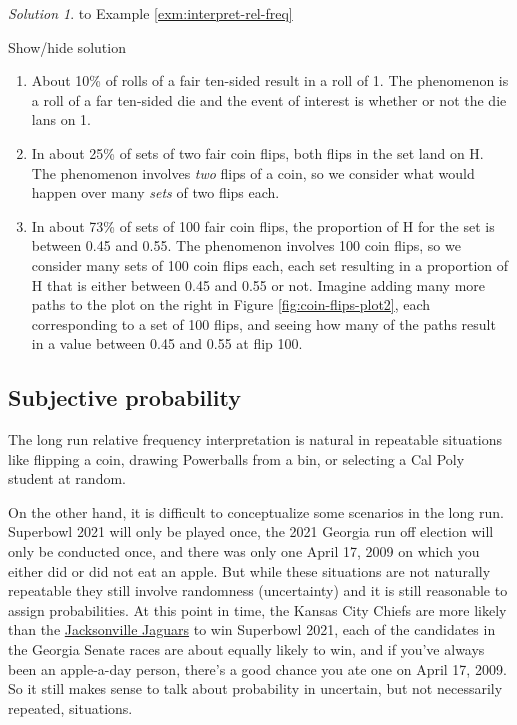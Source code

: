 \documentclass[
]{book}
\providecommand{\tightlist}{%
  \setlength{\itemsep}{0pt}\setlength{\parskip}{0pt}}
\theoremstyle{definition}
\theoremstyle{definition}
\theoremstyle{definition}
\theoremstyle{remark}
\newtheorem*{solution}{Solution}
\begin{document}
\begin{solution}
{}to Example \ref{exm:interpret-rel-freq}
\end{solution}

Show/hide solution

\begin{enumerate}
\def\labelenumi{\arabic{enumi}.}
\tightlist
\item
  About 10\% of rolls of a fair ten-sided result in a roll of 1. The phenomenon is a roll of a far ten-sided die and the event of interest is whether or not the die lans on 1.
\item
  In about 25\% of sets of two fair coin flips, both flips in the set land on H. The phenomenon involves \emph{two} flips of a coin, so we consider what would happen over many \emph{sets} of two flips each.
\item
  In about 73\% of sets of 100 fair coin flips, the proportion of H for the set is between 0.45 and 0.55. The phenomenon involves 100 coin flips, so we consider many sets of 100 coin flips each, each set resulting in a proportion of H that is either between 0.45 and 0.55 or not. Imagine adding many more paths to the plot on the right in Figure \ref{fig:coin-flips-plot2}, each corresponding to a set of 100 flips, and seeing how many of the paths result in a value between 0.45 and 0.55 at flip 100.
\end{enumerate}

\hypertarget{subjective-probability}{%
\subsection{Subjective probability}\label{subjective-probability}}

The long run relative frequency interpretation is natural in repeatable situations like flipping a coin, drawing Powerballs from a bin, or selecting a Cal Poly student at random.

On the other hand, it is difficult to conceptualize some scenarios in the long run. Superbowl 2021 will only be played once, the 2021 Georgia run off election will only be conducted once, and there was only one April 17, 2009 on which you either did or did not eat an apple. But while these situations are not naturally repeatable they still involve randomness (uncertainty) and it is still reasonable to assign probabilities. At this point in time, the Kansas City Chiefs are more likely than the \href{https://tenor.com/0JBf.gif}{Jacksonville Jaguars} to win Superbowl 2021, each of the candidates in the Georgia Senate races are about equally likely to win, and if you've always been an apple-a-day person, there's a good chance you ate one on April 17, 2009. So it still makes sense to talk about probability in uncertain, but not necessarily repeated, situations.
\end{document}
